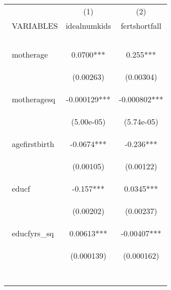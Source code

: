 \documentclass[]{article}
\begin{document}
\begin{center}
\begin{tabular}{lcc} \hline
 & (1) & (2) \\\
VARIABLES & idealnumkids & fertshortfall \\\ \hline
\vspace{4pt} & \begin{footnotesize}\end{footnotesize} & \begin{footnotesize}\end{footnotesize} \\\
motherage & 0.0700*** & 0.255*** \\\
\vspace{4pt} & \begin{footnotesize}(0.00263)\end{footnotesize} & \begin{footnotesize}(0.00304)\end{footnotesize} \\\
motheragesq & -0.000129*** & -0.000802*** \\\
\vspace{4pt} & \begin{footnotesize}(5.00e-05)\end{footnotesize} & \begin{footnotesize}(5.74e-05)\end{footnotesize} \\\
agefirstbirth & -0.0674*** & -0.236*** \\\
\vspace{4pt} & \begin{footnotesize}(0.00105)\end{footnotesize} & \begin{footnotesize}(0.00122)\end{footnotesize} \\\
educf & -0.157*** & 0.0345*** \\\
\vspace{4pt} & \begin{footnotesize}(0.00202)\end{footnotesize} & \begin{footnotesize}(0.00237)\end{footnotesize} \\\
educfyrs\_sq & 0.00613*** & -0.00407*** \\\
\vspace{4pt} & \begin{footnotesize}(0.000139)\end{footnotesize} & \begin{footnotesize}(0.000162)\end{footnotesize} \\\

\end{tabular}
\end{center}
\end{document}
